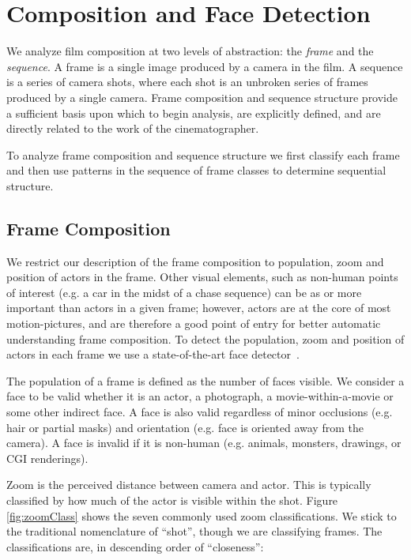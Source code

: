 \section*{Composition and Face Detection}

We analyze film composition at two levels of abstraction: the \emph{frame} and the \emph{sequence}.  A frame is a single image produced by a camera in the film.  A sequence is a series of camera shots, where each shot is an unbroken series of frames produced by a single camera.  Frame composition and sequence structure provide a sufficient basis upon which to begin analysis, are explicitly defined, and are directly related to the work of the cinematographer.

To analyze frame composition and sequence structure we first classify each frame and then use patterns in the sequence of frame classes to determine sequential structure.

\subsection*{Frame Composition}

We restrict our description of the frame composition to population, zoom and position of actors in the frame. Other visual elements, such as non-human points of interest (e.g. a car in the midst of a chase sequence) can be as or more important than actors in a given frame; however, actors are at the core of most motion-pictures, and are therefore a good point of entry for better automatic understanding frame composition. To detect the population, zoom and position of actors in each frame we use a state-of-the-art face detector~\cite{mathias_face_2014}.

The population of a frame is defined as the number of faces visible. We consider a face to be valid whether it is an actor, a photograph, a movie-within-a-movie or some other indirect face. A face is also valid regardless of minor occlusions (e.g. hair or partial masks) and orientation (e.g. face is oriented away from the camera). A face is invalid if it is non-human (e.g. animals, monsters, drawings, or CGI renderings). 

Zoom is the perceived distance between camera and actor. This is typically classified by how much of the actor is visible within the shot. Figure \ref{fig:zoomClass} shows the seven commonly used zoom classifications. We stick to the traditional nomenclature of ``shot'', though we are classifying frames. The classifications  are, in descending order of ``closeness'':



